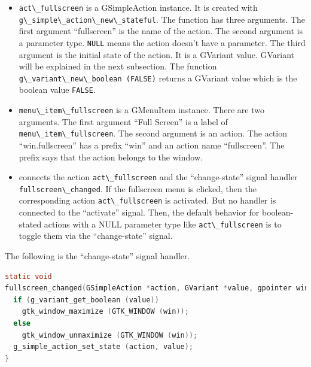 \begin{itemize}
\tightlist
\item
  \passthrough{\lstinline!act\_fullscreen!} is a GSimpleAction instance.
  It is created with
  \passthrough{\lstinline!g\_simple\_action\_new\_stateful!}. The
  function has three arguments. The first argument ``fullscreen'' is the
  name of the action. The second argument is a parameter type.
  \passthrough{\lstinline!NULL!} means the action doesn't have a
  parameter. The third argument is the initial state of the action. It
  is a GVariant value. GVariant will be explained in the next
  subsection. The function
  \passthrough{\lstinline!g\_variant\_new\_boolean (FALSE)!} returns a
  GVariant value which is the boolean value
  \passthrough{\lstinline!FALSE!}.
\item
  \passthrough{\lstinline!menu\_item\_fullscreen!} is a GMenuItem
  instance. There are two arguments. The first argument ``Full Screen''
  is a label of \passthrough{\lstinline!menu\_item\_fullscreen!}. The
  second argument is an action. The action ``win.fullscreen'' has a
  prefix ``win'' and an action name ``fullscreen''. The prefix says that
  the action belongs to the window.
\item
  connects the action \passthrough{\lstinline!act\_fullscreen!} and the
  ``change-state'' signal handler
  \passthrough{\lstinline!fullscreen\_changed!}. If the fullscreen menu
  is clicked, then the corresponding action
  \passthrough{\lstinline!act\_fullscreen!} is activated. But no handler
  is connected to the ``activate'' signal. Then, the default behavior
  for boolean-stated actions with a NULL parameter type like
  \passthrough{\lstinline!act\_fullscreen!} is to toggle them via the
  ``change-state'' signal.
\end{itemize}

The following is the ``change-state'' signal handler.

\begin{lstlisting}[language=C]
static void
fullscreen_changed(GSimpleAction *action, GVariant *value, gpointer win) {
  if (g_variant_get_boolean (value))
    gtk_window_maximize (GTK_WINDOW (win));
  else
    gtk_window_unmaximize (GTK_WINDOW (win));
  g_simple_action_set_state (action, value);
}
\end{lstlisting}

